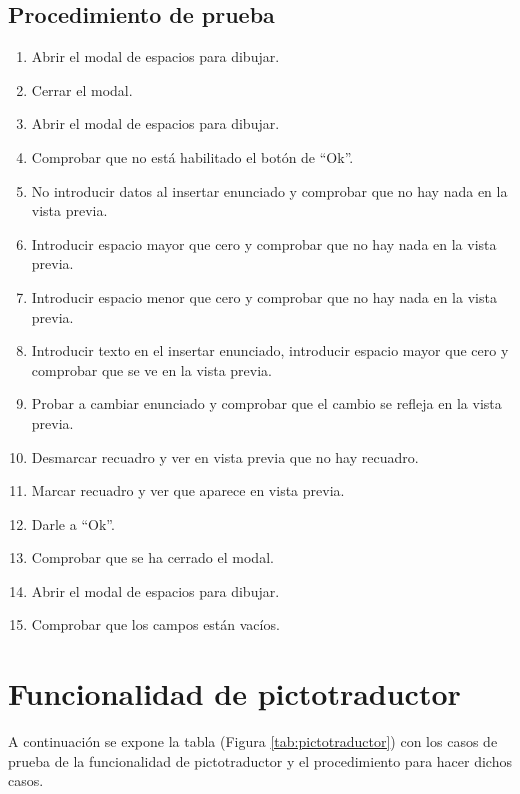 \subsection{Procedimiento de prueba}
\label{procedimientoPruebas:dibujar}
\begin{enumerate}
    \item Abrir el modal de espacios para dibujar.
    \item Cerrar el modal.
    \item Abrir el modal de espacios para dibujar.
    \item Comprobar que no está habilitado el botón de ``Ok''.
    \item No introducir datos al insertar enunciado y comprobar que no hay nada en la vista previa.
    \item Introducir espacio mayor que cero y comprobar que no hay nada en la vista previa.
    \item Introducir espacio menor que cero y comprobar que no hay nada en la vista previa.
    \item Introducir texto en el insertar enunciado, introducir espacio  mayor que cero y comprobar que se ve en la vista previa.
    \item Probar a cambiar enunciado y comprobar que el cambio se refleja en la vista previa.
    \item Desmarcar recuadro y ver en vista previa que no hay recuadro.
    \item Marcar recuadro y ver que aparece en vista previa.
    \item Darle a ``Ok''.
    \item Comprobar que se ha cerrado el modal.
    \item Abrir el modal de  espacios para dibujar.
    \item Comprobar que los campos están vacíos.
\end{enumerate}

\section{Funcionalidad de pictotraductor}
\label{planPruebas:pictotraductor}
A continuación se expone la tabla (Figura \ref{tab:pictotraductor}) con los casos de prueba de la funcionalidad de pictotraductor y el procedimiento para hacer dichos casos.

